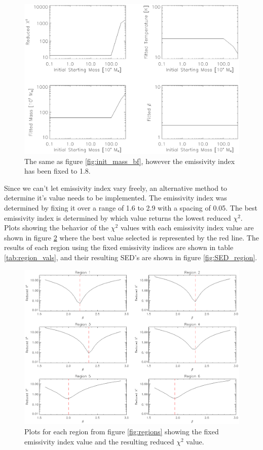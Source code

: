\begin{figure}
  \centering
  \includegraphics[width=1.\textwidth]{sed_imgs/beta_1_return.eps}
  \caption[Initial Mass Dependence and Convergence of SED Fits for Region Fluxes and Fixed Emissivity Index]{The same as figure \ref{fig:init_mass_bf}, however the emissivity index has been fixed to 1.8.}
  \label{fig:init_mass_b1}
\end{figure}

Since we can't let emissivity index vary freely, an alternative method to determine it's value needs to be implemented.  The emissivity index was determined by fixing it over a range of 1.6 to 2.9 with a spacing of 0.05.  The best emissivity index is determined by which value returns the lowest reduced $\chi^2$.  Plots showing the behavior of the $\chi^2$ values with each emissivity index value are shown in figure \ref{fig:beta_reg_sel} where the best value selected is represented by the red line. The results of each region using the fixed emissivity indices are shown in table \ref{tab:region_vals}, and their resulting SED's are shown in figure \ref{fig:SED_region}.

\begin{figure}
  \centering
  \includegraphics[width=1.\textwidth]{sed_imgs/beta_vals.eps}
  \caption[Region Flux Best Emissivity Index Selection]{Plots for each region from figure \ref{fig:regions} showing the fixed emissivity index value and the resulting reduced $\chi^2$ value.}
  \label{fig:beta_reg_sel}
\end{figure}

